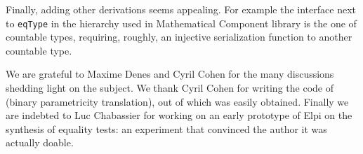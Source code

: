 \documentclass[sigplan,10pt,review]{acmart}\settopmatter{printfolios=true,printccs=false,printacmref=false}
\newcommand{\derive}[1]{\keys{#1}}
\begin{document}
Finally, adding other derivations seems appealing. For example
the interface next to \lstinline+eqType+ in the hierarchy used
in Mathematical Component library is the one of countable types,
requiring, roughly, an injective serialization function to
another countable type.

\begin{acks}
We are grateful to Maxime Denes and Cyril Cohen for the many discussions
shedding light on the subject. We thank Cyril Cohen for writing the code 
of \derive{param2} (binary parametricity translation), out of which
\derive{param1} was easily obtained.  Finally we are indebted
to Luc Chabassier for working on an early prototype of Elpi on
the synthesis of equality tests: an experiment that convinced
the author it was actually doable.
\end{acks}





\end{document}
